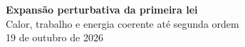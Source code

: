 \documentclass[11pt,a4paper]{article}
\begin{document}
\begin{center}
{\Large\bfseries Expansão perturbativa da primeira lei}\\[5pt]
{\large Calor, trabalho e energia coerente até segunda ordem}\\[5pt]
{\small 19 de outubro de 2026}
\end{center}

{\small\raggedright


}
\end{document}

